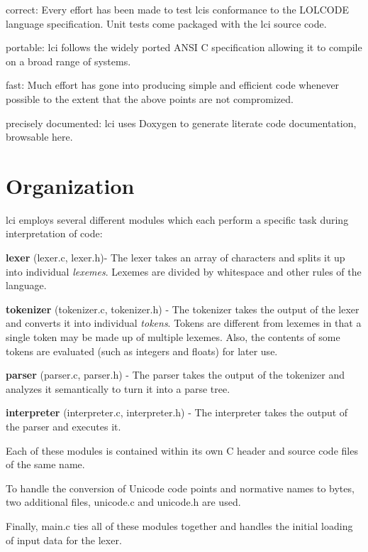 \begin{DoxyItemize}
\item correct\+: Every effort has been made to test lci\textquotesingle{}s conformance to the L\+O\+L\+C\+O\+DE language specification. Unit tests come packaged with the lci source code.
\item portable\+: lci follows the widely ported A\+N\+SI C specification allowing it to compile on a broad range of systems.
\item fast\+: Much effort has gone into producing simple and efficient code whenever possible to the extent that the above points are not compromized.
\item precisely documented\+: lci uses Doxygen to generate literate code documentation, browsable here.
\end{DoxyItemize}\hypertarget{index_organization}{}\section{Organization}\label{index_organization}
lci employs several different modules which each perform a specific task during interpretation of code\+:


\begin{DoxyItemize}
\item {\bfseries lexer} (lexer.\+c, lexer.\+h)-\/ The lexer takes an array of characters and splits it up into individual {\itshape lexemes}. Lexemes are divided by whitespace and other rules of the language.
\item {\bfseries tokenizer} (tokenizer.\+c, tokenizer.\+h) -\/ The tokenizer takes the output of the lexer and converts it into individual {\itshape tokens}. Tokens are different from lexemes in that a single token may be made up of multiple lexemes. Also, the contents of some tokens are evaluated (such as integers and floats) for later use.
\item {\bfseries parser} (parser.\+c, parser.\+h) -\/ The parser takes the output of the tokenizer and analyzes it semantically to turn it into a parse tree.
\item {\bfseries interpreter} (interpreter.\+c, interpreter.\+h) -\/ The interpreter takes the output of the parser and executes it.
\end{DoxyItemize}

Each of these modules is contained within its own C header and source code files of the same name.

To handle the conversion of Unicode code points and normative names to bytes, two additional files, unicode.\+c and unicode.\+h are used.

Finally, main.\+c ties all of these modules together and handles the initial loading of input data for the lexer. 